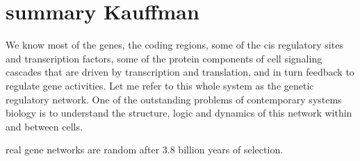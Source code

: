 \section{summary Kauffman}
We know
most of the genes, the coding regions, some of the cis
regulatory sites and transcription factors, some of the
protein components of cell signaling cascades that are
driven by transcription and translation, and in turn
feedback to regulate gene activities. Let me refer to this
whole system as the genetic regulatory network.
One of
the outstanding problems of contemporary systems
biology is to understand the structure, logic and
dynamics of this network within and between cells.

real gene networks are
random after 3.8 billion years of selection. 

